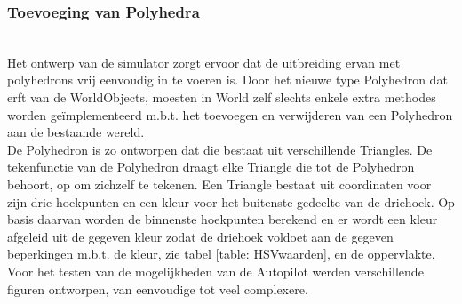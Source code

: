 \subsubsection{Toevoeging van Polyhedra}
\\
Het ontwerp van de simulator zorgt ervoor dat de uitbreiding ervan met polyhedrons vrij eenvoudig in te voeren is. Door het nieuwe type Polyhedron dat erft van de WorldObjects, moesten in World zelf slechts enkele extra methodes worden ge\"implementeerd m.b.t. het toevoegen en verwijderen van een Polyhedron aan de bestaande wereld.\\

\noindent 
De Polyhedron is zo ontworpen dat die bestaat uit verschillende Triangles. De tekenfunctie van de Polyhedron draagt elke Triangle die tot de Polyhedron behoort, op om zichzelf te tekenen. Een Triangle bestaat uit coordinaten voor zijn drie hoekpunten en een kleur voor het buitenste gedeelte van de driehoek. Op basis daarvan worden de binnenste hoekpunten berekend en er wordt een kleur afgeleid uit de gegeven kleur zodat de driehoek voldoet aan de gegeven beperkingen m.b.t. de kleur, zie tabel \ref{table: HSVwaarden}, en de oppervlakte.\\
\noindent
Voor het testen van de mogelijkheden van de Autopilot werden verschillende figuren ontworpen, van eenvoudige tot veel complexere.

